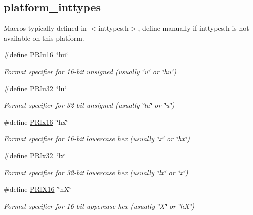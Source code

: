 \subsection*{platform\-\_\-inttypes}
\label{_amgrp35b931ac4659d850ad6bd5148751f3f6}%
Macros typically defined in $<$inttypes.\-h$>$, define manually if inttypes.\-h is not available on this platform. \begin{DoxyCompactItemize}
\item 
\#define \hyperlink{group__hal_ga86bc00ee87e8e40787e0681fc34c576a}{P\-R\-Iu16}~\char`\"{}hu\char`\"{}
\begin{DoxyCompactList}\small\item\em Format specifier for 16-\/bit unsigned (usually {\ttfamily \char`\"{}u\char`\"{}} or {\ttfamily \char`\"{}hu\char`\"{}}) \end{DoxyCompactList}\item 
\#define \hyperlink{group__hal_gaaf2af4a10f0bd308e9c349c8382382be}{P\-R\-Iu32}~\char`\"{}lu\char`\"{}
\begin{DoxyCompactList}\small\item\em Format specifier for 32-\/bit unsigned (usually {\ttfamily \char`\"{}lu\char`\"{}} or {\ttfamily \char`\"{}u\char`\"{}}) \end{DoxyCompactList}\item 
\#define \hyperlink{group__hal_ga70f5e38b517f714518c970a4da37bef1}{P\-R\-Ix16}~\char`\"{}hx\char`\"{}
\begin{DoxyCompactList}\small\item\em Format specifier for 16-\/bit lowercase hex (usually {\ttfamily \char`\"{}x\char`\"{}} or {\ttfamily \char`\"{}hx\char`\"{}}) \end{DoxyCompactList}\item 
\#define \hyperlink{group__hal_ga80ca66bcc9e366733f02c90ed4b0838c}{P\-R\-Ix32}~\char`\"{}lx\char`\"{}
\begin{DoxyCompactList}\small\item\em Format specifier for 32-\/bit lowercase hex (usually {\ttfamily \char`\"{}lx\char`\"{}} or {\ttfamily \char`\"{}x\char`\"{}}) \end{DoxyCompactList}\item 
\#define \hyperlink{group__hal_ga570ca9af5087023f75fc8a1a602d26ab}{P\-R\-I\-X16}~\char`\"{}h\-X\char`\"{}
\begin{DoxyCompactList}\small\item\em Format specifier for 16-\/bit uppercase hex (usually {\ttfamily \char`\"{}\-X\char`\"{}} or {\ttfamily \char`\"{}h\-X\char`\"{}}) \end{DoxyCompactList}\end{DoxyCompactItemize}
